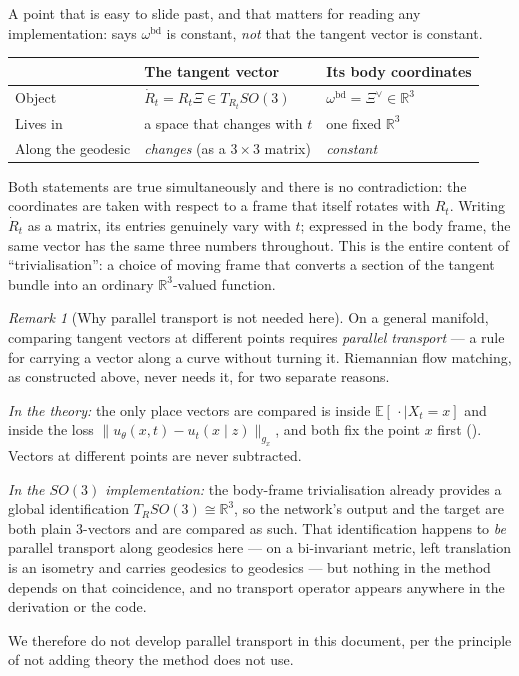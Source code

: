 \documentclass[11pt,a4paper]{report}
\theoremstyle{definition}
\theoremstyle{remark}
\newtheorem{remark}[remark]{Remark}
\newcommand{\RR}{\mathbb R}
\newcommand{\EE}{\mathbb E}
\begin{document}
A point that is easy to slide past, and that matters for reading any
implementation:  says
$\omega^{\mathrm{bd}}$ is constant, \emph{not} that the tangent vector is
constant.

\begin{center}
\begin{tabular}{p{4.6cm}p{4.6cm}p{4.6cm}}
\toprule
& \textbf{The tangent vector} & \textbf{Its body coordinates} \\
\midrule
Object & $\dot R_t = R_t\Xi\in T_{R_t}SO(3)$ & $\omega^{\mathrm{bd}}=\Xi^\vee\in\RR^3$ \\
Lives in & a space that changes with $t$ & one fixed $\RR^3$ \\
Along the geodesic & \emph{changes} (as a $3\times3$ matrix) & \emph{constant} \\
\bottomrule
\end{tabular}
\end{center}

Both statements are true simultaneously and there is no contradiction: the
coordinates are taken with respect to a frame that itself rotates with
$R_t$. Writing $\dot R_t$ as a matrix, its entries genuinely vary with $t$;
expressed in the body frame, the same vector has the same three numbers
throughout. This is the entire content of ``trivialisation'': a choice of
moving frame that converts a section of the tangent bundle into an ordinary
$\RR^3$-valued function.

\begin{remark}[Why parallel transport is not needed here]
\label{rem:no-parallel-transport}
On a general manifold, comparing tangent vectors at different points
requires \emph{parallel transport} --- a rule for carrying a vector along a
curve without turning it. Riemannian flow matching, as constructed above,
never needs it, for two separate reasons.

\emph{In the theory:} the only place vectors are compared is inside
$\EE[\,\cdot\mid X_t=x]$ and inside the loss $\|u_\theta(x,t)-u_t(x\mid z)\|_{g_x}$,
and both fix the point $x$ first (). Vectors at
different points are never subtracted.

\emph{In the $SO(3)$ implementation:} the body-frame trivialisation already
provides a global identification $T_RSO(3)\cong\RR^3$, so the network's
output and the target are both plain $3$-vectors and are compared as such.
That identification happens to \emph{be} parallel transport along geodesics
here --- on a bi-invariant metric, left translation is an isometry and
carries geodesics to geodesics --- but nothing in the method depends on that
coincidence, and no transport operator appears anywhere in the derivation or
the code.

We therefore do not develop parallel transport in this document, per the
principle of not adding theory the method does not use.
\end{remark}
\end{document}
